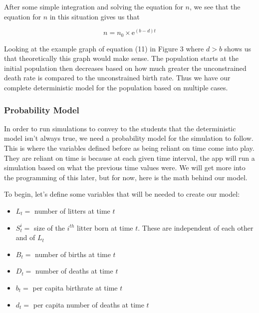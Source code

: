 \documentclass{article}\usepackage[]{graphicx}\usepackage[]{color}
\begin{document}
\noindent After some simple integration and solving the equation for \(n\), we see that the equation for \(n\) in this situation gives us that 

\begin{equation}
n = n_0 \times \mathrm{e}^{(b-d)t}
\end{equation}

Looking at the example graph of equation (11) in Figure 3 where \(d > b\) shows us that theoretically this graph would make sense. The population starts at the initial population then decreases based on how much greater the unconstrained death rate is compared to the unconstrained birth rate. Thus we have our complete deterministic model for the population based on multiple cases. 






\subsubsection{Probability Model}

In order to run simulations to convey to the students that the deterministic model isn't always true, we need a probability model for the simulation to follow. This is where the variables defined before as being reliant on time come into play. They are reliant on time is because at each given time interval, the app will run a simulation based on what the previous time values were. We will get more into the programming of this later, but for now, here is the math behind our model.

To begin, let's define some variables that will be needed to create our model:

\begin{itemize}

\item \(L_t =\) number of litters at time \(t\)

\item \(S_t^i =\) size of the \(i^{th}\) litter born at time \(t\). These are independent of each other and of \(L_t\)

\item \(B_t =\) number of births at time \(t\)

\item \(D_t =\) number of deaths at time \(t\)

\item \(b_t =\) per capita birthrate at time \(t\)

\item \(d_t =\) per capita number of deaths at time \(t\)
\end{itemize}
\end{document}
